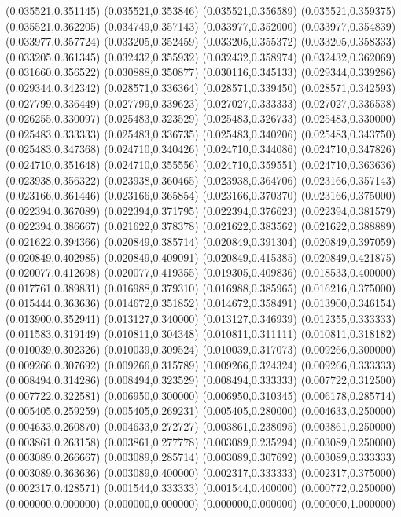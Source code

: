 (0.035521,0.351145)
(0.035521,0.353846)
(0.035521,0.356589)
(0.035521,0.359375)
(0.035521,0.362205)
(0.034749,0.357143)
(0.033977,0.352000)
(0.033977,0.354839)
(0.033977,0.357724)
(0.033205,0.352459)
(0.033205,0.355372)
(0.033205,0.358333)
(0.033205,0.361345)
(0.032432,0.355932)
(0.032432,0.358974)
(0.032432,0.362069)
(0.031660,0.356522)
(0.030888,0.350877)
(0.030116,0.345133)
(0.029344,0.339286)
(0.029344,0.342342)
(0.028571,0.336364)
(0.028571,0.339450)
(0.028571,0.342593)
(0.027799,0.336449)
(0.027799,0.339623)
(0.027027,0.333333)
(0.027027,0.336538)
(0.026255,0.330097)
(0.025483,0.323529)
(0.025483,0.326733)
(0.025483,0.330000)
(0.025483,0.333333)
(0.025483,0.336735)
(0.025483,0.340206)
(0.025483,0.343750)
(0.025483,0.347368)
(0.024710,0.340426)
(0.024710,0.344086)
(0.024710,0.347826)
(0.024710,0.351648)
(0.024710,0.355556)
(0.024710,0.359551)
(0.024710,0.363636)
(0.023938,0.356322)
(0.023938,0.360465)
(0.023938,0.364706)
(0.023166,0.357143)
(0.023166,0.361446)
(0.023166,0.365854)
(0.023166,0.370370)
(0.023166,0.375000)
(0.022394,0.367089)
(0.022394,0.371795)
(0.022394,0.376623)
(0.022394,0.381579)
(0.022394,0.386667)
(0.021622,0.378378)
(0.021622,0.383562)
(0.021622,0.388889)
(0.021622,0.394366)
(0.020849,0.385714)
(0.020849,0.391304)
(0.020849,0.397059)
(0.020849,0.402985)
(0.020849,0.409091)
(0.020849,0.415385)
(0.020849,0.421875)
(0.020077,0.412698)
(0.020077,0.419355)
(0.019305,0.409836)
(0.018533,0.400000)
(0.017761,0.389831)
(0.016988,0.379310)
(0.016988,0.385965)
(0.016216,0.375000)
(0.015444,0.363636)
(0.014672,0.351852)
(0.014672,0.358491)
(0.013900,0.346154)
(0.013900,0.352941)
(0.013127,0.340000)
(0.013127,0.346939)
(0.012355,0.333333)
(0.011583,0.319149)
(0.010811,0.304348)
(0.010811,0.311111)
(0.010811,0.318182)
(0.010039,0.302326)
(0.010039,0.309524)
(0.010039,0.317073)
(0.009266,0.300000)
(0.009266,0.307692)
(0.009266,0.315789)
(0.009266,0.324324)
(0.009266,0.333333)
(0.008494,0.314286)
(0.008494,0.323529)
(0.008494,0.333333)
(0.007722,0.312500)
(0.007722,0.322581)
(0.006950,0.300000)
(0.006950,0.310345)
(0.006178,0.285714)
(0.005405,0.259259)
(0.005405,0.269231)
(0.005405,0.280000)
(0.004633,0.250000)
(0.004633,0.260870)
(0.004633,0.272727)
(0.003861,0.238095)
(0.003861,0.250000)
(0.003861,0.263158)
(0.003861,0.277778)
(0.003089,0.235294)
(0.003089,0.250000)
(0.003089,0.266667)
(0.003089,0.285714)
(0.003089,0.307692)
(0.003089,0.333333)
(0.003089,0.363636)
(0.003089,0.400000)
(0.002317,0.333333)
(0.002317,0.375000)
(0.002317,0.428571)
(0.001544,0.333333)
(0.001544,0.400000)
(0.000772,0.250000)
(0.000000,0.000000)
(0.000000,0.000000)
(0.000000,0.000000)
(0.000000,1.000000)